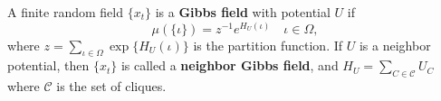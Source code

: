 A finite random field $\{x_t\}$ is a \textbf{Gibbs field} with potential $U$ if
$$\mu(\{\iota\}) = z^{-1} e^{H_U(\iota)} \quad \iota \in \Omega,$$
where $z = \sum_{\iota \in \Omega} \exp\{H_U(\iota)\}$ is the partition function. If $U$ is a neighbor potential, then $\{x_t\}$ is called a \textbf{neighbor Gibbs field}, and $H_U = \sum_{C \in \mathcal{C}} U_C$ where $\mathcal{C}$ is the set of cliques.
